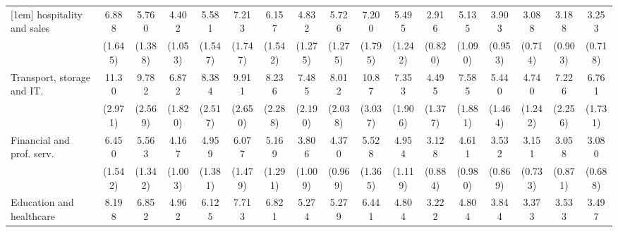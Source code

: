 {\begin{tabular}{l*{16}{c}}
[1em]
hospitality and sales&       6.888\sym{***}&       5.760\sym{***}&       4.402\sym{***}&       5.581\sym{***}&       7.213\sym{***}&       6.157\sym{***}&       4.832\sym{***}&       5.726\sym{***}&       7.200\sym{***}&       5.495\sym{***}&       2.916\sym{***}&       5.135\sym{***}&       3.903\sym{***}&       3.088\sym{***}&       3.188\sym{***}&       3.253\sym{***}\\
                    &     (1.645)         &     (1.388)         &     (1.053)         &     (1.547)         &     (1.747)         &     (1.542)         &     (1.275)         &     (1.275)         &     (1.795)         &     (1.242)         &     (0.820)         &     (1.090)         &     (0.953)         &     (0.714)         &     (0.903)         &     (0.718)         \\
[1em]
Transport, storage and IT.&       11.30\sym{***}&       9.782\sym{***}&       6.872\sym{***}&       8.384\sym{***}&       9.911\sym{***}&       8.236\sym{***}&       7.485\sym{***}&       8.012\sym{***}&       10.87\sym{***}&       7.353\sym{***}&       4.495\sym{***}&       7.585\sym{***}&       5.440\sym{***}&       4.740\sym{***}&       7.226\sym{***}&       6.761\sym{***}\\
                    &     (2.971)         &     (2.569)         &     (1.820)         &     (2.517)         &     (2.650)         &     (2.288)         &     (2.190)         &     (2.038)         &     (3.037)         &     (1.906)         &     (1.377)         &     (1.881)         &     (1.464)         &     (1.242)         &     (2.256)         &     (1.731)         \\
[1em]
Financial and prof. serv.&       6.450\sym{***}&       5.563\sym{***}&       4.167\sym{***}&       4.959\sym{***}&       6.077\sym{***}&       5.169\sym{***}&       3.806\sym{***}&       4.370\sym{***}&       5.528\sym{***}&       4.954\sym{***}&       3.128\sym{***}&       4.611\sym{***}&       3.532\sym{***}&       3.151\sym{***}&       3.058\sym{***}&       3.080\sym{***}\\
                    &     (1.542)         &     (1.342)         &     (1.003)         &     (1.381)         &     (1.479)         &     (1.291)         &     (1.009)         &     (0.969)         &     (1.365)         &     (1.119)         &     (0.884)         &     (0.980)         &     (0.869)         &     (0.733)         &     (0.871)         &     (0.688)         \\
[1em]
Education and healthcare&       8.198\sym{***}&       6.852\sym{***}&       4.962\sym{***}&       6.125\sym{***}&       7.713\sym{***}&       6.821\sym{***}&       5.274\sym{***}&       5.279\sym{***}&       6.441\sym{***}&       4.804\sym{***}&       3.222\sym{***}&       4.804\sym{***}&       3.844\sym{***}&       3.373\sym{***}&       3.533\sym{***}&       3.497\sym{***}\\

\end{tabular}}
